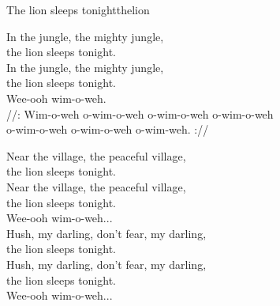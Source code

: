 \begin{song}{The lion sleeps tonight}{thelion}
\begin{vers}
In the jungle, the mighty jungle, \\
the lion sleeps tonight.\\
In the jungle, the mighty jungle, \\
the lion sleeps tonight.\\
Wee-ooh wim-o-weh.\\
//: Wim-o-weh o-wim-o-weh o-wim-o-weh o-wim-o-weh\\
o-wim-o-weh o-wim-o-weh o-wim-weh. ://\\
\end{vers}
\begin{vers}
Near the village, the peaceful village, \\
the lion sleeps tonight.\\
Near the village, the peaceful village, \\
the lion sleeps tonight.\\
Wee-ooh wim-o-weh...\\
Hush, my darling, don't fear, my darling, \\
the lion sleeps tonight.\\
Hush, my darling, don't fear, my darling, \\
the lion sleeps tonight.\\
Wee-ooh wim-o-weh...\\
\end{vers}
\end{song}
